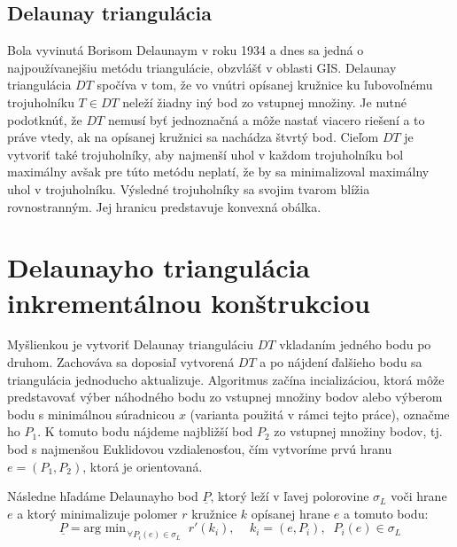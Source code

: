 \documentclass[11pt]{article}
\begin{document}
\subsection{Delaunay triangulácia}
Bola vyvinutá Borisom Delaunaym v roku 1934 a dnes sa jedná o najpoužívanejšiu metódu triangulácie, obzvlášť v oblasti GIS. Delaunay triangulácia $DT$ spočíva v tom, že vo vnútri opísanej kružnice ku ľubovoľnému trojuholníku $T \in DT$ neleží žiadny iný bod zo vstupnej množiny. Je nutné podotknúť, že $DT$ nemusí byť jednoznačná a môže nastať viacero riešení a to práve vtedy, ak na opísanej kružnici sa nachádza štvrtý bod. Cieľom $DT$ je vytvoriť také trojuholníky, aby najmenší uhol v každom trojuholníku bol maximálny avšak pre túto metódu neplatí, že by sa minimalizoval maximálny uhol v trojuholníku. Výsledné trojuholníky sa svojim tvarom blížia rovnostranným. Jej hranicu predstavuje konvexná obálka.

\newpage
\section{Delaunayho triangulácia inkrementálnou konštrukciou}
Myšlienkou je vytvoriť Delaunay trianguláciu $DT$ vkladaním jedného bodu po druhom. Zachováva sa doposiaľ vytvorená $DT$ a po nájdení ďalšieho bodu sa triangulácia jednoducho aktualizuje. Algoritmus začína incializáciou, ktorá môže predstavovať výber náhodného bodu zo vstupnej množiny bodov alebo výberom bodu s minimálnou súradnicou $x$ (varianta použitá v rámci tejto práce), označme ho $P_1$. K tomuto bodu nájdeme najbližší bod $P_2$ zo vstupnej množiny bodov, tj. bod s najmenšou Euklidovou vzdialenosťou, čím vytvoríme prvú hranu $e = (P_1, P_2)$, ktorá je orientovaná. 

Následne hľadáme Delaunayho bod $\underline{P}$, ktorý leží v ľavej polorovine $\sigma_L$ voči hrane $e$ a ktorý minimalizuje polomer $r$ kružnice $k$ opísanej hrane $e$ a tomuto bodu:
\begin{equation*}
\underline{P} = \text{arg min}_{\, \forall P_i(e) \in \sigma_L} \; \; r'(k_i), \quad \, k_i = (e, P_i), \; \; P_i(e) \in \sigma_L
\end{equation*}
\end{document}
